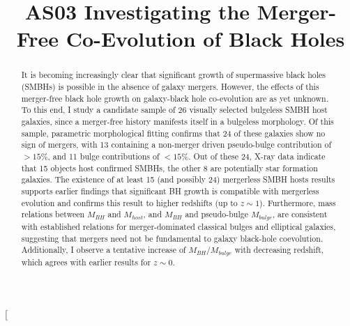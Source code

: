 \documentclass[11pt,twocolumn]{article}
\begin{document}
\title{AS03 Investigating the Merger-Free Co-Evolution of Black Holes}

\date{}

\twocolumn[
  \begin{@twocolumnfalse}
\vspace{-3em}


    \maketitle

\vspace{-5em}

\renewcommand{\abstractname}{\normalsize Abstract}
    \begin{abstract}
\normalsize
\noindent
 It is becoming increasingly clear that significant growth of supermassive black holes (SMBHs) is possible in the absence of galaxy mergers. However, the effects of this merger-free black hole growth on galaxy-black hole co-evolution are as yet unknown. To this end, I study a candidate sample of 26 visually selected bulgeless SMBH host galaxies, since a merger-free history manifests itself in a bulgeless morphology. Of this sample, parametric morphological fitting confirms that 24 of these galaxies show no sign of mergers, with 13 containing a non-merger driven pseudo-bulge contribution of  $>15 \%$, and 11 bulge contributions of $<15\%$. Out of these 24, X-ray data indicate that 15 objects host confirmed SMBHs, the other 8 are potentially star formation galaxies.  The existence of at least 15 (and possibly 24) mergerless SMBH hosts results supports earlier findings that significant BH growth is compatible with mergerless evolution and confirms this result to higher redshifts (up to $ z\sim1$). Furthermore, mass relations between $M_{BH}$ and $M_{host}$, and $M_{BH}$ and pseudo-bulge $M_{bulge}$, are consistent with established relations for merger-dominated classical bulges and elliptical galaxies, suggesting that mergers need not be fundamental to galaxy black-hole coevolution. Additionally, I observe a tentative increase of $M_{BH}/M_{bulge}$ with decreasing redshift, which agrees with earlier results for $z\sim 0$. 


\end{abstract}
\end{@twocolumnfalse}
\end{document}
